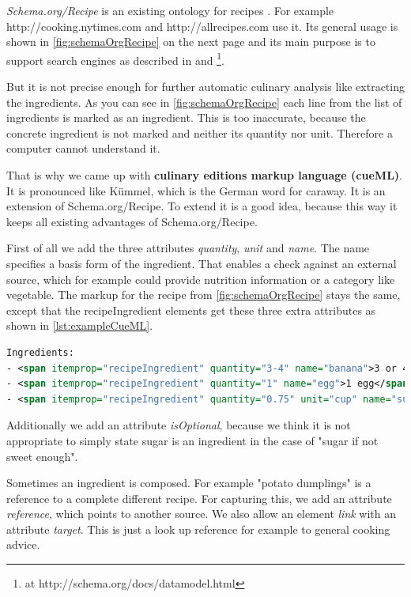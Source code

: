 \documentclass[12pt, twoside]{report}
\begin{document}
\textit{Schema.org/Recipe} is an existing ontology for recipes \parencite{schemaOrg}. For example http://cooking.nytimes.com and http://allrecipes.com use it. Its general usage is shown in \cref{fig:schemaOrgRecipe} on the next page and its main purpose is to support search engines as described in \parencite{foodBlogger} and \parencite{schemaOrg} \footnote{at http://schema.org/docs/datamodel.html}.

But it is not precise enough for further automatic culinary analysis like extracting the ingredients. As you can see in \cref{fig:schemaOrgRecipe} each line from the list of ingredients is marked as an ingredient. This is too inaccurate, because the concrete ingredient is not marked and neither its quantity nor unit. Therefore a computer cannot understand it.

That is why we came up with \textbf{culinary editions markup language (cueML)}. It is pronounced like Kümmel, which is the German word for caraway. It is an extension of Schema.org/Recipe. To extend it is a good idea, because this way it keeps all existing advantages of Schema.org/Recipe.

First of all we add the three attributes \textit{quantity}, \textit{unit} and \textit{name}. The name specifies a basis form of the ingredient. That enables a check against an external source, which for example could provide nutrition information or a category like vegetable. The markup for the recipe from \cref{fig:schemaOrgRecipe} stays the same, except that the recipeIngredient elements get these three extra attributes as shown in \cref{lst:exampleCueML}.

\begin{minipage}{\linewidth} %
\begin{lstlisting}[language=XML, caption={Example for cueML}, label=lst:exampleCueML]
Ingredients:
- <span itemprop="recipeIngredient" quantity="3-4" name="banana">3 or 4 ripe bananas, smashed</span>
- <span itemprop="recipeIngredient" quantity="1" name="egg">1 egg</span>
- <span itemprop="recipeIngredient" quantity="0.75" unit="cup" name="sugar">3/4 cup of sugar</span>
\end{lstlisting}
\end{minipage}

Additionally we add an attribute \textit{isOptional}, because we think it is not appropriate to simply state sugar is an ingredient in the case of "sugar if not sweet enough". 

Sometimes an ingredient is composed. For example "potato dumplings" is a reference to a complete different recipe. For capturing this, we add an attribute \textit{reference}, which points to another source. We also allow an element \textit{link} with an attribute \textit{target}. This is just a look up reference for example to general cooking advice. 
\end{document}
